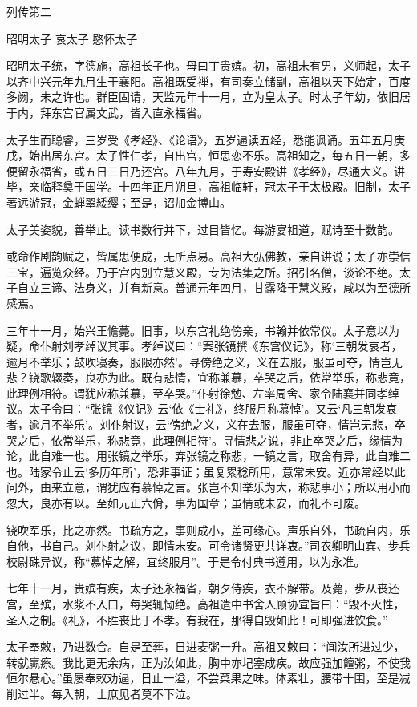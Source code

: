 \documentclass[12pt,UTF8]{ctexbook}
\begin{document}
列传第二

昭明太子 哀太子 愍怀太子

昭明太子统，字德施，高祖长子也。母曰丁贵嫔。初，高祖未有男，义师起，太子以齐中兴元年九月生于襄阳。高祖既受禅，有司奏立储副，高祖以天下始定，百度多阙，未之许也。群臣固请，天监元年十一月，立为皇太子。时太子年幼，依旧居于内，拜东宫官属文武，皆入直永福省。

太子生而聪睿，三岁受《孝经》、《论语》，五岁遍读五经，悉能讽诵。五年五月庚戌，始出居东宫。太子性仁孝，自出宫，恒思恋不乐。高祖知之，每五日一朝，多便留永福省，或五日三日乃还宫。八年九月，于寿安殿讲《孝经》，尽通大义。讲毕，亲临释奠于国学。十四年正月朔旦，高祖临轩，冠太子于太极殿。旧制，太子著远游冠，金蝉翠緌缨；至是，诏加金博山。

太子美姿貌，善举止。读书数行并下，过目皆忆。每游宴祖道，赋诗至十数韵。

或命作剧韵赋之，皆属思便成，无所点易。高祖大弘佛教，亲自讲说；太子亦崇信三宝，遍览众经。乃于宫内别立慧义殿，专为法集之所。招引名僧，谈论不绝。太子自立三谛、法身义，并有新意。普通元年四月，甘露降于慧义殿，咸以为至德所感焉。

三年十一月，始兴王憺薨。旧事，以东宫礼绝傍亲，书翰并依常仪。太子意以为疑，命仆射刘孝绰议其事。孝绰议曰：“案张镜撰《东宫仪记》，称‘三朝发哀者，逾月不举乐；鼓吹寝奏，服限亦然’。寻傍绝之义，义在去服，服虽可夺，情岂无悲？铙歌辍奏，良亦为此。既有悲情，宜称兼慕，卒哭之后，依常举乐，称悲竟，此理例相符。谓犹应称兼慕，至卒哭。”仆射徐勉、左率周舍、家令陆襄并同孝绰议。太子令曰：“张镜《仪记》云‘依《士礼》，终服月称慕悼’。又云‘凡三朝发哀者，逾月不举乐’。刘仆射议，云‘傍绝之义，义在去服，服虽可夺，情岂无悲，卒哭之后，依常举乐，称悲竟，此理例相符’。寻情悲之说，非止卒哭之后，缘情为论，此自难一也。用张镜之举乐，弃张镜之称悲，一镜之言，取舍有异，此自难二也。陆家令止云‘多历年所’，恐非事证；虽复累稔所用，意常未安。近亦常经以此问外，由来立意，谓犹应有慕悼之言。张岂不知举乐为大，称悲事小；所以用小而忽大，良亦有以。至如元正六佾，事为国章；虽情或未安，而礼不可废。

铙吹军乐，比之亦然。书疏方之，事则成小，差可缘心。声乐自外，书疏自内，乐自他，书自己。刘仆射之议，即情未安。可令诸贤更共详衷。”司农卿明山宾、步兵校尉硃异议，称“慕悼之解，宜终服月”。于是令付典书遵用，以为永准。

七年十一月，贵嫔有疾，太子还永福省，朝夕侍疾，衣不解带。及薨，步从丧还宫，至殡，水浆不入口，每哭辄恸绝。高祖遣中书舍人顾协宣旨曰：“毁不灭性，圣人之制。《礼》，不胜丧比于不孝。有我在，那得自毁如此！可即强进饮食。”

太子奉敕，乃进数合。自是至葬，日进麦粥一升。高祖又敕曰：“闻汝所进过少，转就羸瘵。我比更无余病，正为汝如此，胸中亦圮塞成疾。故应强加饘粥，不使我恒尔悬心。”虽屡奉敕劝逼，日止一溢，不尝菜果之味。体素壮，腰带十围，至是减削过半。每入朝，士庶见者莫不下泣。
\end{document}
